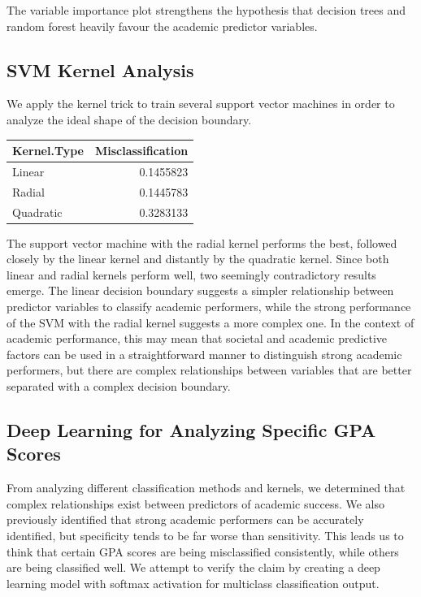 \documentclass[
]{article}
\begin{document}
The variable importance plot strengthens the hypothesis that decision
trees and random forest heavily favour the academic predictor variables.

\subsection{SVM Kernel Analysis}\label{svm-kernel-analysis}

We apply the kernel trick to train several support vector machines in
order to analyze the ideal shape of the decision boundary.

\begin{longtable}[]{@{}lr@{}}
\toprule\noalign{}
Kernel.Type & Misclassification \\
\midrule\noalign{}
\endhead
\bottomrule\noalign{}
\endlastfoot
Linear & 0.1455823 \\
Radial & 0.1445783 \\
Quadratic & 0.3283133 \\
\end{longtable}

The support vector machine with the radial kernel performs the best,
followed closely by the linear kernel and distantly by the quadratic
kernel. Since both linear and radial kernels perform well, two seemingly
contradictory results emerge. The linear decision boundary suggests a
simpler relationship between predictor variables to classify academic
performers, while the strong performance of the SVM with the radial
kernel suggests a more complex one. In the context of academic
performance, this may mean that societal and academic predictive factors
can be used in a straightforward manner to distinguish strong academic
performers, but there are complex relationships between variables that
are better separated with a complex decision boundary.

\subsection{Deep Learning for Analyzing Specific GPA
Scores}\label{deep-learning-for-analyzing-specific-gpa-scores}

From analyzing different classification methods and kernels, we
determined that complex relationships exist between predictors of
academic success. We also previously identified that strong academic
performers can be accurately identified, but specificity tends to be far
worse than sensitivity. This leads us to think that certain GPA scores
are being misclassified consistently, while others are being classified
well. We attempt to verify the claim by creating a deep learning model
with softmax activation for multiclass classification output.
\end{document}
